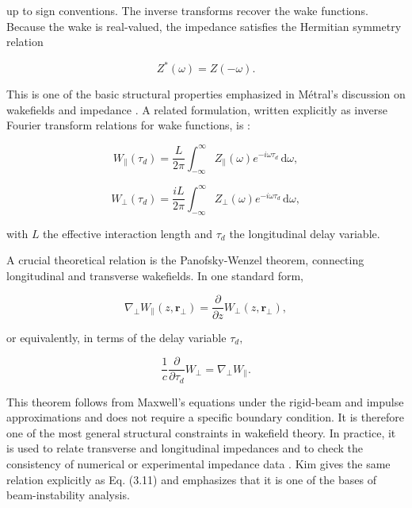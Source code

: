 up to sign conventions. The inverse transforms recover the wake functions. Because the wake is real-valued, the impedance satisfies the Hermitian symmetry relation

\begin{equation}
\label{eq:12}
Z^{*}(\omega)=Z(-\omega).
\end{equation}

This is one of the basic structural properties emphasized in Métral’s discussion on wakefields and impedance \cite{metral2021wake}. A related formulation, written explicitly as inverse Fourier transform relations for wake functions, is \cite{kim2025gpu}:

\begin{equation}
\label{eq:13}
W_{\parallel}(\tau_d)=\frac{L}{2\pi}\int_{-\infty}^{\infty}Z_{\parallel}(\omega)e^{-i\omega\tau_d}\,\mathrm{d}\omega,
\end{equation}

\begin{equation}
\label{eq:14}
W_{\perp}(\tau_d)=\frac{iL}{2\pi}\int_{-\infty}^{\infty}Z_{\perp}(\omega)e^{-i\omega\tau_d}\,\mathrm{d}\omega,
\end{equation}

with \(L\) the effective interaction length and \(\tau_{d}\) the longitudinal delay variable.

A crucial theoretical relation is the Panofsky-Wenzel theorem, connecting longitudinal and transverse wakefields. In one standard form,

\begin{equation}
\label{eq:15}
\nabla_{\perp}W_{\parallel}(z,\mathbf r_{\perp})=\frac{\partial}{\partial z}W_{\perp}(z,\mathbf r_{\perp}),
\end{equation}

or equivalently, in terms of the delay variable \(\tau_{d} ,\)

\begin{equation}
\label{eq:16}
\frac1c\frac{\partial}{\partial\tau_d}W_{\perp}=\nabla_{\perp}W_{\parallel}.
\end{equation}

This theorem follows from Maxwell’s equations under the rigid-beam and impulse approximations and does not require a specific boundary condition. It is therefore one of the most general structural constraints in wakefield theory. In practice, it is used to relate transverse and longitudinal impedances and to check the consistency of numerical or experimental impedance data \cite{metral2021wake}. Kim \cite{kim2025gpu} gives the same relation explicitly as Eq. (3.11) and emphasizes that it is one of the bases of beam-instability analysis.

